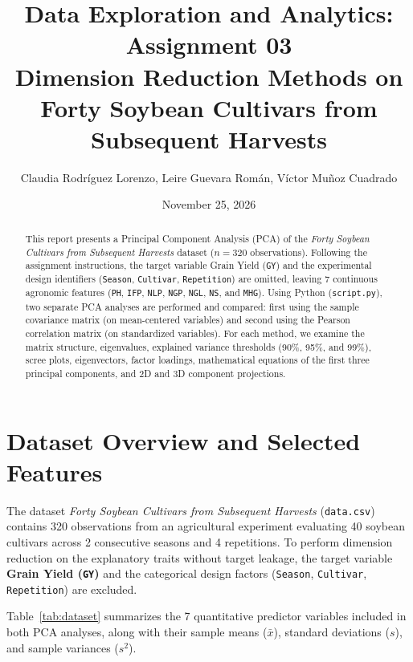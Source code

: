 \documentclass[11pt,a4paper]{article}
\title{\vspace{3cm}\textbf{\LARGE Data Exploration and Analytics: Assignment 03}\\[0.4em]
\large Dimension Reduction Methods on Forty Soybean Cultivars from Subsequent Harvests}
\author{Claudia Rodr\'iguez Lorenzo, Leire Guevara Rom\'an, V\'ictor Mu\~noz Cuadrado}
\date{November 25, 2026}
\begin{document}
\maketitle
\vspace{0.6cm}
\begin{abstract}
\noindent
This report presents a Principal Component Analysis (PCA) of the \textit{Forty Soybean Cultivars from Subsequent Harvests} dataset ($n = 320$ observations). Following the assignment instructions, the target variable Grain Yield (\texttt{GY}) and the experimental design identifiers (\texttt{Season}, \texttt{Cultivar}, \texttt{Repetition}) are omitted, leaving 7 continuous agronomic features (\texttt{PH}, \texttt{IFP}, \texttt{NLP}, \texttt{NGP}, \texttt{NGL}, \texttt{NS}, and \texttt{MHG}). Using Python (\texttt{script.py}), two separate PCA analyses are performed and compared: first using the sample covariance matrix (on mean-centered variables) and second using the Pearson correlation matrix (on standardized variables). For each method, we examine the matrix structure, eigenvalues, explained variance thresholds (90\%, 95\%, and 99\%), scree plots, eigenvectors, factor loadings, mathematical equations of the first three principal components, and 2D and 3D component projections.
\end{abstract}

\newpage
\tableofcontents
\newpage

\section{Dataset Overview and Selected Features}

The dataset \textit{Forty Soybean Cultivars from Subsequent Harvests} (\texttt{data.csv}) contains 320 observations from an agricultural experiment evaluating 40 soybean cultivars across 2 consecutive seasons and 4 repetitions. To perform dimension reduction on the explanatory traits without target leakage, the target variable \textbf{Grain Yield (\texttt{GY})} and the categorical design factors (\texttt{Season}, \texttt{Cultivar}, \texttt{Repetition}) are excluded.

Table~\ref{tab:dataset} summarizes the 7 quantitative predictor variables included in both PCA analyses, along with their sample means ($\bar{x}$), standard deviations ($s$), and sample variances ($s^2$).
\end{document}
